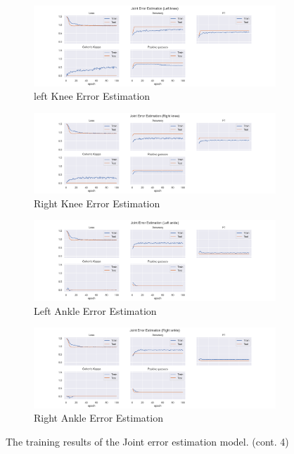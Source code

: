 \begin{figure}
  \centering
  \begin{subfigure}[b]{0.47\linewidth}
      \centering
      \includegraphics[width=\textwidth]{figures/Results/jt/JointErrorEstimation_Left knee.png}
      \caption{left Knee Error Estimation}
      \label{fig:lekn_jt_ee}
  \end{subfigure}
  \hfill
  \begin{subfigure}[b]{0.47\linewidth}
      \centering
      \includegraphics[width=\textwidth]{figures/Results/jt/JointErrorEstimation_Right knee.png}
      \caption{Right Knee Error Estimation}
      \label{fig:rikn_jt_ee}
  \end{subfigure}
  \hfill
  \begin{subfigure}[b]{0.47\linewidth}
      \centering
      \includegraphics[width=\textwidth]{figures/Results/jt/JointErrorEstimation_Left ankle.png}
      \caption{Left Ankle Error Estimation}
      \label{fig:lean_jt_ee}
  \end{subfigure}
  \hfill
  \begin{subfigure}[b]{0.47\linewidth}
      \centering
      \includegraphics[width=\textwidth]{figures/Results/jt/JointErrorEstimation_Right ankle.png}
      \caption{Right Ankle Error Estimation}
      \label{fig:rian_jt_ee}
  \end{subfigure}
  \caption[]{The training results of the Joint error estimation model. (cont. 4)}
\end{figure}